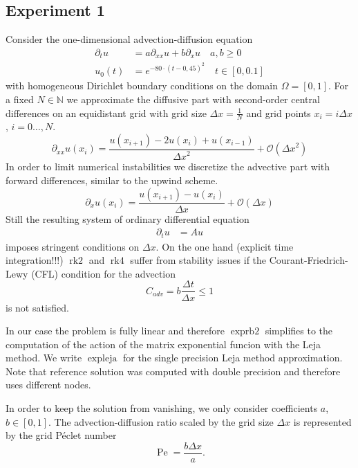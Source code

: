 \documentclass{scrartcl}
\begin{document}
\subsection{Experiment 1}
Consider the one-dimensional advection-diffusion equation
\begin{align*}
\partial_tu &= a\partial_{xx}u + b\partial_xu \quad a,b\ge 0\\
u_0(t) &= e^{-80\cdot(t-0,45)^2} \quad t\in[0,0.1]
\end{align*}
with homogeneous Dirichlet boundary conditions on the domain $\Omega = [0,1]$. 
For a fixed $N\in\mathbb N$ we approximate the diffusive part with second-order central differences on an equidistant grid with grid size $\Delta x = \frac{1}{N}$ and grid points $x_i = i\Delta x$, $i=0\dots,N$.
\[\partial_{xx}u(x_i) = \frac{u(x_{i+1}) - 2u(x_i) + u(x_{i-1})}{{\Delta x}^2} + \mathcal{O}({\Delta x}^2)\]
In order to limit numerical instabilities we discretize the advective part with forward differences, similar to the upwind scheme.
\[\partial_{x}u(x_i) = \frac{u(x_{i+1}) - u(x_i)}{\Delta x} + \mathcal{O}(\Delta x)\]
Still the resulting system of ordinary differential equation 
\begin{align*}
\partial_tu &= Au
\end{align*}
imposes stringent conditions on ${\Delta x}$. On the one hand (explicit time integration!!!) $\operatorname{rk2}$ and $\operatorname{rk4}$ suffer from stability issues if the Courant-Friedrich-Lewy (CFL) condition for the advection
\[ C_{adv} = b\frac{\Delta t}{\Delta x} \le 1\] is not satisfied.



In our case the problem is fully linear and therefore $\operatorname{exprb2}$ simplifies to the computation of the action of the matrix exponential funcion with the Leja method. We write $\operatorname{expleja}$ for the single precision Leja method approximation. Note that reference solution was computed with double precision and therefore uses different nodes.


In order to keep the solution from vanishing, we only consider coefficients $a$, $b\in[0,1]$. The advection-diffusion ratio scaled by the grid size $\Delta x$ is represented by the grid P\'eclet number
\[\operatorname{Pe} = \frac{b \Delta x}{a}.\]
\end{document}

